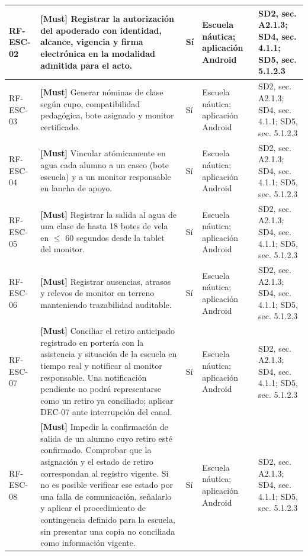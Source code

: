 \begin{paginaHorizontalSynaptix}
\begin{longtable}{|L{0.09\AnchoMatrizTDoce}|L{0.385\AnchoMatrizTDoce}|L{0.065\AnchoMatrizTDoce}|L{0.18\AnchoMatrizTDoce}|L{0.28\AnchoMatrizTDoce}|}
RF-\allowbreak{}ESC-\allowbreak{}02 &
\textbf{[Must]} Registrar la autorización del apoderado con identidad, alcance, vigencia y firma electrónica en la modalidad admitida para el acto. &
Sí &
Escuela náutica; aplicación Android &
SD2, sec. A2.1.3; SD4, sec. 4.1.1; SD5, sec. 5.1.2.3 \\ \hline

RF-\allowbreak{}ESC-\allowbreak{}03 &
\textbf{[Must]} Generar nóminas de clase según cupo, compatibilidad pedagógica, bote asignado y monitor certificado. &
Sí &
Escuela náutica; aplicación Android &
SD2, sec. A2.1.3; SD4, sec. 4.1.1; SD5, sec. 5.1.2.3 \\ \hline

RF-\allowbreak{}ESC-\allowbreak{}04 &
\textbf{[Must]} Vincular atómicamente en agua cada alumno a un casco (bote escuela) y a un monitor responsable en lancha de apoyo. &
Sí &
Escuela náutica; aplicación Android &
SD2, sec. A2.1.3; SD4, sec. 4.1.1; SD5, sec. 5.1.2.3 \\ \hline

RF-\allowbreak{}ESC-\allowbreak{}05 &
\textbf{[Must]} Registrar la salida al agua de una clase de hasta 18 botes de vela en \(\leq\) 60 segundos desde la tablet del monitor. &
Sí &
Escuela náutica; aplicación Android &
SD2, sec. A2.1.3; SD4, sec. 4.1.1; SD5, sec. 5.1.2.3 \\ \hline

RF-\allowbreak{}ESC-\allowbreak{}06 &
\textbf{[Must]} Registrar ausencias, atrasos y relevos de monitor en terreno manteniendo trazabilidad auditable. &
Sí &
Escuela náutica; aplicación Android &
SD2, sec. A2.1.3; SD4, sec. 4.1.1; SD5, sec. 5.1.2.3 \\ \hline

RF-\allowbreak{}ESC-\allowbreak{}07 &
\textbf{[Must]} Conciliar el retiro anticipado registrado en portería con la asistencia y situación de la escuela en tiempo real y notificar al monitor responsable. Una notificación pendiente no podrá representarse como un retiro ya conciliado; aplicar DEC-07 ante interrupción del canal. &
Sí &
Escuela náutica; aplicación Android &
SD2, sec. A2.1.3; SD4, sec. 4.1.1; SD5, sec. 5.1.2.3 \\ \hline

RF-\allowbreak{}ESC-\allowbreak{}08 &
\textbf{[Must]} Impedir la confirmación de salida de un alumno cuyo retiro esté confirmado. Comprobar que la asignación y el estado de retiro correspondan al registro vigente. Si no es posible verificar ese estado por una falla de comunicación, señalarlo y aplicar el procedimiento de contingencia definido para la escuela, sin presentar una copia no conciliada como información vigente. &
Sí &
Escuela náutica; aplicación Android &
SD2, sec. A2.1.3; SD4, sec. 4.1.1; SD5, sec. 5.1.2.3 \\ \hline


\end{longtable}
\end{paginaHorizontalSynaptix}
